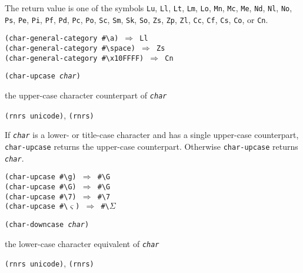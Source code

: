 The return value is one of the symbols \texttt{Lu}, \texttt{Ll},
\texttt{Lt}, \texttt{Lm}, \texttt{Lo}, \texttt{Mn}, \texttt{Mc},
\texttt{Me}, \texttt{Nd}, \texttt{Nl}, \texttt{No}, \texttt{Ps},
\texttt{Pe}, \texttt{Pi}, \texttt{Pf}, \texttt{Pd}, \texttt{Pc},
\texttt{Po}, \texttt{Sc}, \texttt{Sm}, \texttt{Sk}, \texttt{So},
\texttt{Zs}, \texttt{Zp}, \texttt{Zl}, \texttt{Cc}, \texttt{Cf},
\texttt{Cs}, \texttt{Co}, or \texttt{Cn}.


\begin{alltt}
(char-general-category \#{}\textbackslash{}a) \(\Rightarrow\) Ll
(char-general-category \#{}\textbackslash{}space) \(\Rightarrow\) Zs
(char-general-category \#{}\textbackslash{}x10FFFF) \(\Rightarrow\) Cn  
\end{alltt}

\begin{description}

\label{objects_s206}\item[procedure] \texttt{(char-upcase \textit{char})}



\item[returns] the upper-case character counterpart of \texttt{\textit{char}}


\item[libraries] \texttt{(rnrs unicode)}, \texttt{(rnrs)}
\end{description}


If \texttt{\textit{char}} is a lower- or title-case character and has a single
upper-case counterpart, \texttt{char-upcase} returns the upper-case
counterpart.
Otherwise \texttt{char-upcase} returns \texttt{\textit{char}}.


\begin{alltt}
(char-upcase \#{}\textbackslash{}g) \(\Rightarrow\) \#{}\textbackslash{}G
(char-upcase \#{}\textbackslash{}G) \(\Rightarrow\) \#{}\textbackslash{}G
(char-upcase \#{}\textbackslash{}7) \(\Rightarrow\) \#{}\textbackslash{}7
(char-upcase \#{}\textbackslash{}\(\varsigma\)) \(\Rightarrow\) \#{}\textbackslash{}\(\Sigma\)
\end{alltt}

\begin{description}

\label{objects_s207}\item[procedure] \texttt{(char-downcase \textit{char})}



\item[returns] the lower-case character equivalent of \texttt{\textit{char}}


\item[libraries] \texttt{(rnrs unicode)}, \texttt{(rnrs)}
\end{description}


